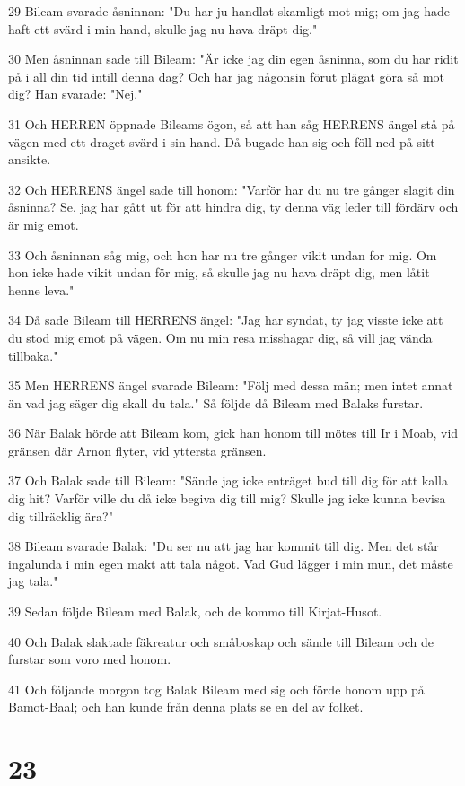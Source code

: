 \par 29 Bileam svarade åsninnan: "Du har ju handlat skamligt mot mig; om jag hade haft ett svärd i min hand, skulle jag nu hava dräpt dig."
\par 30 Men åsninnan sade till Bileam: "Är icke jag din egen åsninna, som du har ridit på i all din tid intill denna dag? Och har jag någonsin förut plägat göra så mot dig? Han svarade: "Nej."
\par 31 Och HERREN öppnade Bileams ögon, så att han såg HERRENS ängel stå på vägen med ett draget svärd i sin hand. Då bugade han sig och föll ned på sitt ansikte.
\par 32 Och HERRENS ängel sade till honom: "Varför har du nu tre gånger slagit din åsninna? Se, jag har gått ut för att hindra dig, ty denna väg leder till fördärv och är mig emot.
\par 33 Och åsninnan såg mig, och hon har nu tre gånger vikit undan for mig. Om hon icke hade vikit undan för mig, så skulle jag nu hava dräpt dig, men låtit henne leva."
\par 34 Då sade Bileam till HERRENS ängel: "Jag har syndat, ty jag visste icke att du stod mig emot på vägen. Om nu min resa misshagar dig, så vill jag vända tillbaka."
\par 35 Men HERRENS ängel svarade Bileam: "Följ med dessa män; men intet annat än vad jag säger dig skall du tala." Så följde då Bileam med Balaks furstar.
\par 36 När Balak hörde att Bileam kom, gick han honom till mötes till Ir i Moab, vid gränsen där Arnon flyter, vid yttersta gränsen.
\par 37 Och Balak sade till Bileam: "Sände jag icke enträget bud till dig för att kalla dig hit? Varför ville du då icke begiva dig till mig? Skulle jag icke kunna bevisa dig tillräcklig ära?"
\par 38 Bileam svarade Balak: "Du ser nu att jag har kommit till dig. Men det står ingalunda i min egen makt att tala något. Vad Gud lägger i min mun, det måste jag tala."
\par 39 Sedan följde Bileam med Balak, och de kommo till Kirjat-Husot.
\par 40 Och Balak slaktade fäkreatur och småboskap och sände till Bileam och de furstar som voro med honom.
\par 41 Och följande morgon tog Balak Bileam med sig och förde honom upp på Bamot-Baal; och han kunde från denna plats se en del av folket.

\chapter{23}

